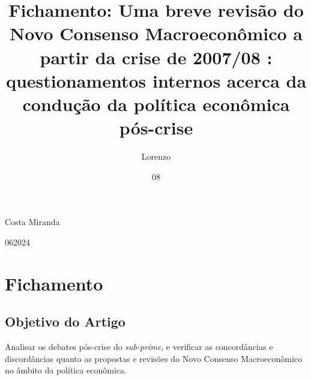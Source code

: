 \documentclass[report]{uftex}
\newcommand\uftex{UF\TeX}
\begin{document}
  \title{Fichamento: Uma breve
  	revisão do Novo Consenso Macroeconômico
  	a partir da crise de 2007/08 : questionamentos internos
  	acerca da condução da política econômica pós-crise}
  \author{Lorenzo}{Costa Miranda}
  \date{08}{06}{2024}
  \keyword{\LaTeX}
  \keyword{\uftex}
  \foreignkeyword{\LaTeX}
  \foreignkeyword{\uftex}
  \maketitle

  \frontmatter

  \printlosymbols  
  \printloabbreviations
 
\mainmatter
\onehalfspacing
\chapter{Fichamento}

\section{Objetivo do Artigo}

Analisar os debates pós-crise do \textit{sub-prime}, e verificar as concordâncias e discordâncias quanto as propostas e revisões do Novo Consenso Macroeconômico no âmbito da política econômica.
\end{document}
